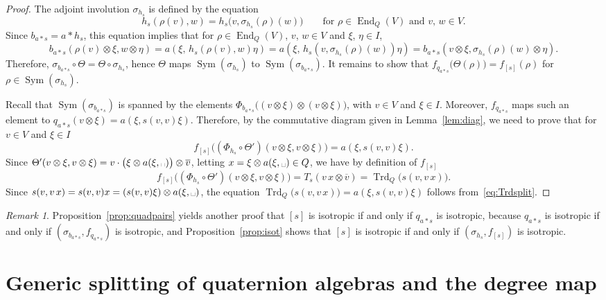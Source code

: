 \documentclass{amsart}
\DeclareMathOperator{\End}{End}
\DeclareMathOperator{\Trd}{Trd}
\DeclareMathOperator{\Sym}{Sym}
\theoremstyle{remark}
\newtheorem*{remk}{Remark}
\begin{document}
\begin{proof}
  The adjoint involution $\sigma_{h_s}$ is defined by the equation
  \[
    h_s(\rho(v),w) = h_s\bigl(v,\sigma_{h_s}(\rho)(w)\bigr)
    \qquad\text{for $\rho\in\End_Q(V)$ and $v$, $w\in V$.}
  \]
  Since $b_{a*s}=a*h_s$, this equation implies that for
  $\rho\in\End_Q(V)$, $v$, $w\in V$ and $\xi$, $\eta\in I$,
  \[
    b_{a*s}(\rho(v)\otimes\xi, w\otimes\eta) =
    a(\xi,\,h_s(\rho(v),w)\eta) = a(\xi,\,
    h_s(v,\sigma_{h_s}(\rho)(w))\eta) = b_{a*s}(v\otimes\xi,
    \sigma_{h_s}(\rho)(w)\otimes\eta).
  \]
  Therefore, $\sigma_{b_{a*s}}\circ\Theta = \Theta\circ\sigma_{h_s}$,
  hence $\Theta$ maps $\Sym(\sigma_{h_s})$ to
  $\Sym(\sigma_{b_{a*s}})$. It remains to show that
  $f_{q_{a*s}}\bigl(\Theta(\rho)\bigr) = f_{[s]}(\rho)$ for $\rho\in
  \Sym(\sigma_{h_s})$.
  
  Recall that $\Sym(\sigma_{b_{a*s}})$ is spanned by the elements
  $\Phi_{b_{a*s}}\bigl((v\otimes \xi)\otimes (v\otimes \xi)\bigr)$,
  with $v\in V$ and $\xi\in I$. Moreover,  
  $f_{q_{a*s}}$ maps such an element to $q_{a*s}(v\otimes
  \xi)=a(\xi,s(v,v)\xi)$.  
Therefore, by the commutative diagram given in Lemma~\ref{lem:diag},
we need to prove that for $v\in V$ and $\xi\in I$
    \[
       f_{[s]}\bigl((\Phi_{h_s}\circ\Theta')(v\otimes\xi,
      v\otimes\xi)\bigr)=a(\xi,s(v,v)\xi). 
    \]
  Since $\Theta'(v\otimes\xi, v\otimes\xi) =
     v\cdot\bigl(\xi\otimes a(\xi,
     \mbox{\textvisiblespace})\bigr)\otimes 
     \overline v$, letting $x= \xi\otimes a(\xi,
     \mbox{\textvisiblespace})\in Q$, we have by definition of
     $f_{[s]}$ 
     \[
       f_{[s]}\bigl((\Phi_{h_s}\circ\Theta')(v\otimes\xi,
      v\otimes\xi)\bigr) = T_s(v\,x\otimes\overline v) =
      \Trd_Q\bigl(s(v,v\,x)\bigr).
    \]
   Since $s(v,v\,x) = s(v,v)x=(s(v,v)\xi)\otimes a(\xi,
    \mbox{\textvisiblespace})$, the equation
    $\Trd_Q\bigl(s(v,v\,x)\bigr) = a(\xi, s(v,v)\xi)$ follows
    from~\eqref{eq:Trdsplit}. 
  \end{proof}

\begin{remk}
  Proposition~\ref{prop:quadpairs} yields another proof that $[s]$ is
  isotropic if and only if $q_{a*s}$ is isotropic, because $q_{a*s}$
  is isotropic if and only if $(\sigma_{b_{a*s}},f_{q_{a*s}})$ is
  isotropic, and Proposition~\ref{prop:isot} shows that $[s]$ is
  isotropic if and only if $(\sigma_{h_s}, f_{[s]})$ is isotropic.  
\end{remk}
\section{Generic splitting of quaternion algebras and the degree map}
\label{sec:gen}
\end{document}
